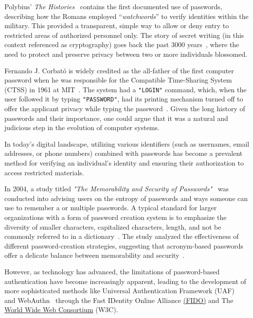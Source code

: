 Polybius' \textit{The Histories}~\cite{perseus_tufts} contains the first documented use of passwords, describing how
the Romans employed ``\textit{watchwords}'' to verify identities within the military.
This provided a transparent, simple way to allow or deny entry to restricted areas of authorized personnel only.
The story of secret writing (in this context referenced as cryptography) goes back the past 3000 years~\cite{history_cryptography_cryptanalysis},
where the need to protect and preserve privacy between two or more individuals blossomed.

Fernando J. Corbató is widely credited as the all-father of the first computer password when he was responsible for
the Compatible Time-Sharing System (CTSS) in 1961 at MIT~\cite{levy1984hackers}.
The system had a \texttt{"LOGIN"} command, which, when the user followed it by typing \texttt{"PASSWORD"},
had its printing mechanism turned off to offer the applicant privacy while typing the password~\cite{ctss_programmers_guide}.
Given the long history of passwords and their importance, one could argue that it was a natural and judicious
step in the evolution of computer systems.

In today's digital landscape, utilizing various identifiers (such as usernames, email addresses, or phone numbers)
combined with passwords has become a prevalent method for verifying an individual's identity and ensuring
their authorization to access restricted materials.

In 2004, a study titled \textit{"The Memorability and Security of Passwords"}~\cite{yan2000password} was conducted into
advising users on the entropy of passwords and ways someone can use to remember a or multiple passwords.
A typical standard for larger organizations with a form of password creation system is to emphasize the diversity of
smaller characters, capitalized characters, length, and not be commonly referred to in a dictionary~\cite{yan2000password}.
The study analyzed the effectiveness of different password-creation strategies, suggesting that acronym-based
passwords offer a delicate balance between memorability and security~\cite{yan2000password}.

However, as technology has advanced, the limitations of password-based authentication have become increasingly
apparent, leading to the development of more sophisticated methods like Universal Authentication Framework
(UAF)~\cite{fido_uaf_overview} and WebAuthn~\cite{webauthn_level_2} through the Fast IDentity Online Alliance
\href{https://fidoalliance.org}{(FIDO)} and The \href{https://www.w3.org}{World Wide Web Consortium} (W3C).

